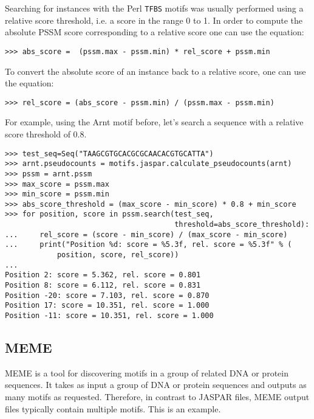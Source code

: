 \begin{itemize}
Searching for instances with the Perl \verb+TFBS+ motifs was usually performed using a relative score threshold, i.e. a score in the range 0 to 1. In order to compute the absolute PSSM score corresponding to a relative score one can use the equation:
\begin{verbatim}
>>> abs_score =  (pssm.max - pssm.min) * rel_score + pssm.min
\end{verbatim}
To convert the absolute score of an instance back to a relative score, one can use the equation:
\begin{verbatim}
>>> rel_score = (abs_score - pssm.min) / (pssm.max - pssm.min)
\end{verbatim}
For example, using the Arnt motif before, let's search a sequence with a relative score threshold of 0.8.
\begin{verbatim}
>>> test_seq=Seq("TAAGCGTGCACGCGCAACACGTGCATTA")
>>> arnt.pseudocounts = motifs.jaspar.calculate_pseudocounts(arnt)
>>> pssm = arnt.pssm
>>> max_score = pssm.max
>>> min_score = pssm.min
>>> abs_score_threshold = (max_score - min_score) * 0.8 + min_score
>>> for position, score in pssm.search(test_seq,
                                       threshold=abs_score_threshold):
...     rel_score = (score - min_score) / (max_score - min_score)
...     print("Position %d: score = %5.3f, rel. score = %5.3f" % (
            position, score, rel_score))
...
Position 2: score = 5.362, rel. score = 0.801
Position 8: score = 6.112, rel. score = 0.831
Position -20: score = 7.103, rel. score = 0.870
Position 17: score = 10.351, rel. score = 1.000
Position -11: score = 10.351, rel. score = 1.000
\end{verbatim}
\end{itemize}

\subsection{MEME}

MEME \cite{bailey1994} is a tool for discovering motifs in a group of related
DNA or protein sequences. It takes as input a group of DNA or protein sequences
and outputs as many motifs as requested. Therefore, in contrast to JASPAR
files, MEME output files typically contain multiple motifs. This is an example.

